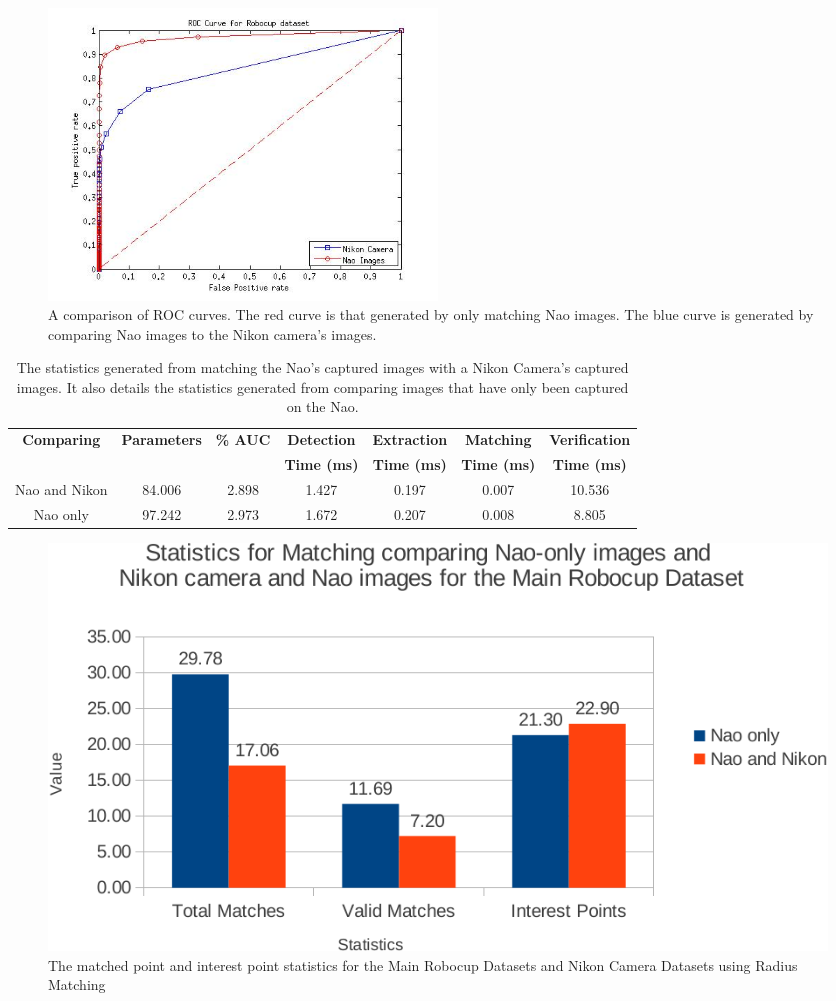 \documentclass[11pt]{report}
\begin{document}
\begin{figure}[h!] 
  \centering
    \includegraphics[width=0.5\textwidth]{../Drawings/camera/ROC_Robocup.jpg}
    \caption{A comparison of ROC curves. The red curve is that generated by only matching Nao images. The blue curve is generated by comparing Nao images to the Nikon camera's images. }
    \label{fig:rocRobocupNikon}
\end{figure}

\begin{table}
\caption{The statistics generated from matching the Nao's captured images with
a Nikon Camera's captured images. It also details the statistics generated from comparing images that have only been captured on the Nao.}
\footnotesize
\begin{tabular}{|c|c|c|c|c|c|c|}
\hline 
\textbf{Comparing} & \textbf{Parameters} & \textbf{\% AUC} & \textbf{Detection} & \textbf{Extraction} & \textbf{Matching} & \textbf{Verification}\tabularnewline
 &  &  & \textbf{Time (ms)} & \textbf{Time (ms)} & \textbf{Time (ms)} & \textbf{Time (ms)}\tabularnewline
\hline 
\hline 
Nao and Nikon & 84.006 & 2.898 & 1.427 & 0.197 & 0.007 & 10.536\tabularnewline
\hline 
Nao only & 97.242 & 2.973 & 1.672 & 0.207 & 0.008 & 8.805\tabularnewline
\hline 
\end{tabular}
\label{tab:naoNikonRobocup}
\end{table}

\begin{figure}[h!] 
  \centering
    \includegraphics[width=1.0\textwidth]{../Drawings/Graphs/nikon_mrb_matches_keypoints_best.pdf}
    \caption{The matched point and interest point statistics for the Main Robocup Datasets
and Nikon Camera Datasets using Radius Matching}
    \label{fig:nikon_mrb_matches_keypoints}
\end{figure}
\end{document}
